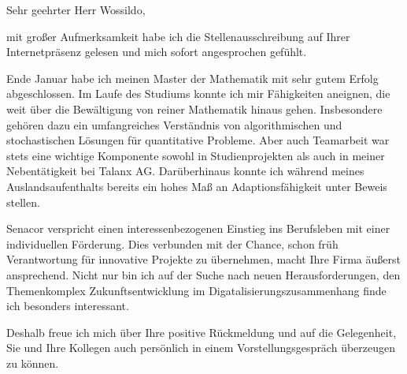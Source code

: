\documentclass[11pt,a4paper,sans]{moderncv}        %
\begin{document}
Sehr geehrter Herr Wossildo,
\begin{justify}mit großer Aufmerksamkeit habe ich die Stellenausschreibung auf Ihrer Internetpräsenz gelesen und mich sofort angesprochen gefühlt. 

Ende Januar habe ich meinen Master der Mathematik mit sehr gutem Erfolg abgeschlossen.
Im Laufe des Studiums konnte ich mir Fähigkeiten aneignen, die weit über die Bewältigung von reiner Mathematik hinaus gehen.
Insbesondere gehören dazu ein umfangreiches Verständnis von algorithmischen und stochastischen Lösungen für quantitative Probleme.
Aber auch Teamarbeit war stets eine wichtige Komponente sowohl in Studienprojekten als auch in meiner Nebentätigkeit bei Talanx AG. 
Darüberhinaus konnte ich während meines Auslandsaufenthalts bereits ein hohes Maß an Adaptionsfähigkeit unter Beweis stellen.
 
Senacor verspricht einen interessenbezogenen Einstieg ins Berufsleben mit einer individuellen Förderung. Dies verbunden mit der Chance, schon früh Verantwortung für innovative Projekte zu übernehmen, macht Ihre Firma äußerst ansprechend. Nicht nur bin ich auf der Suche nach neuen Herausforderungen, den Themenkomplex Zukunftsentwicklung im Digatalisierungszusammenhang finde ich besonders interessant. 

Deshalb freue ich mich über Ihre positive Rückmeldung und auf die Gelegenheit, Sie und Ihre Kollegen auch persönlich in einem Vorstellungsgespräch überzeugen zu können.
\end{justify}

\makeletterclosing

\end{document}
